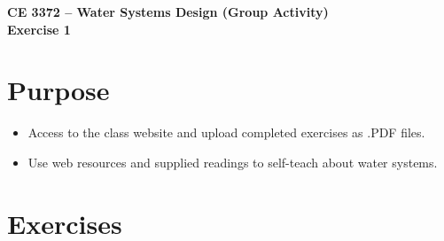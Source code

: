 \documentclass[12pt]{article}
\begin{document}
\begin{center}
{\textbf{{ CE 3372 -- Water Systems Design (Group Activity)} \\ {Exercise 1}}}
\end{center}
\section*{{Purpose}} 
\begin{itemize}
\item Access to the class website and upload completed exercises as .PDF files.
\item Use web resources and supplied readings to self-teach about water systems.
\end{itemize}
\section*{Exercises}
\end{document}
